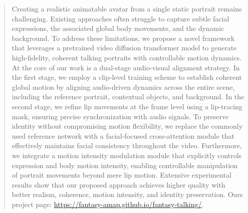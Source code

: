 \documentclass[sigconf]{acmart}
\begin{document}
\begin{abstract}
Creating a realistic animatable avatar from a single static portrait remains challenging. Existing approaches often struggle to capture subtle facial expressions, the associated global body movements, and the dynamic background. To address these limitations, we propose a novel framework that leverages a pretrained video diffusion transformer model to generate high-fidelity, coherent talking portraits with controllable motion dynamics. At the core of our work is a dual-stage audio-visual alignment strategy. In the first stage, we employ a clip-level training scheme to establish coherent global motion by aligning audio-driven dynamics across the entire scene, including the reference portrait, contextual objects, and background. In the second stage, we refine lip movements at the frame level using a lip-tracing mask, ensuring precise synchronization with audio signals. To preserve identity without compromising motion flexibility, we replace the commonly used reference network with a facial-focused cross-attention module that effectively maintains facial consistency throughout the video. Furthermore, we integrate a motion intensity modulation module that explicitly controls expression and body motion intensity, enabling controllable manipulation of portrait movements beyond mere lip motion. Extensive experimental results show that our proposed approach achieves higher quality with better realism, coherence, motion intensity, and identity preservation. Ours project page: \url{https://fantasy-amap.github.io/fantasy-talking/}.
\end{abstract}


\end{document}
